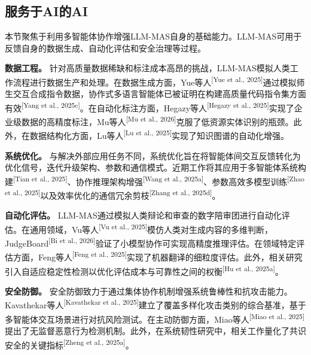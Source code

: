 \documentclass[UTF8,a4paper,12pt]{article}
\begin{document}
\subsection{服务于AI的AI}

本节聚焦于利用多智能体协作增强LLM-MAS自身的基础能力。LLM-MAS可用于反馈自身的数据生成、自动化评估和安全治理等过程。

\textbf{数据工程。} 针对高质量数据稀缺和标注成本高昂的挑战，LLM-MAS模拟人类工作流程进行数据生产和处理。在数据生成方面，Yue等人\textsuperscript{[Yue et al., 2025]}通过模拟师生交互合成指令数据，协作式多语言智能体已被证明在构建高质量代码指令集方面有效\textsuperscript{[Yang et al., 2025c]}。在自动化标注方面，Hegazy等人\textsuperscript{[Hegazy et al., 2025]}实现了企业级数据的高精度标注，Mu等人\textsuperscript{[Mu et al., 2026]}克服了低资源实体识别的瓶颈。此外，在数据结构化方面，Lu等人\textsuperscript{[Lu et al., 2025]}实现了知识图谱的自动化增强。

\textbf{系统优化。} 与解决外部应用任务不同，系统优化旨在将智能体间交互反馈转化为优化信号，迭代升级架构、参数和通信模式。近期工作将其应用于多智能体系统构建\textsuperscript{[Tian et al., 2025]}、协作推理架构增强\textsuperscript{[Wang et al., 2025a]}、参数高效多模型训练\textsuperscript{[Zhao et al., 2025]}以及效率优化的通信冗余剪枝\textsuperscript{[Zhang et al., 2025d]}。

\textbf{自动化评估。} LLM-MAS通过模拟人类辩论和审查的数字陪审团进行自动化评估。在通用领域，Vu等人\textsuperscript{[Vu et al., 2025]}模仿人类对生成内容的多维判断，JudgeBoard\textsuperscript{[Bi et al., 2026]}验证了小模型协作可实现高精度推理评估。在领域特定评估方面，Feng等人\textsuperscript{[Feng et al., 2025]}实现了机器翻译的细粒度评估。此外，相关研究引入自适应稳定性检测以优化评估成本与可靠性之间的权衡\textsuperscript{[Hu et al., 2025a]}。

\textbf{安全防御。} 安全防御致力于通过集体协作机制增强系统鲁棒性和抗攻击能力。Kavathekar等人\textsuperscript{[Kavathekar et al., 2025]}建立了覆盖多样化攻击类别的综合基准，基于多智能体交互场景进行对抗风险测试。在主动防御方面，Miao等人\textsuperscript{[Miao et al., 2025]}提出了无监督恶意行为检测机制。此外，在系统韧性研究中，相关工作量化了共识安全的关键指标\textsuperscript{[Zheng et al., 2025a]}。
\end{document}

